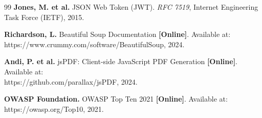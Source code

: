 \begin{thebibliography}{99}
\textbf{Jones, M. et al.} JSON Web Token (JWT). \textit{RFC 7519},
Internet Engineering Task Force (IETF), 2015.

\textbf{Richardson, L.} Beautiful Soup Documentation \textbf{[Online]}.
Available at:\\
https://www.crummy.com/software/BeautifulSoup, 2024.

\textbf{Andi, P. et al.} jsPDF: Client-side JavaScript PDF Generation
\textbf{[Online]}.
Available at:\\
https://github.com/parallax/jsPDF, 2024.


\textbf{OWASP Foundation.} OWASP Top Ten 2021 \textbf{[Online]}.
Available at:\\
https://owasp.org/Top10, 2021.

\end{thebibliography}